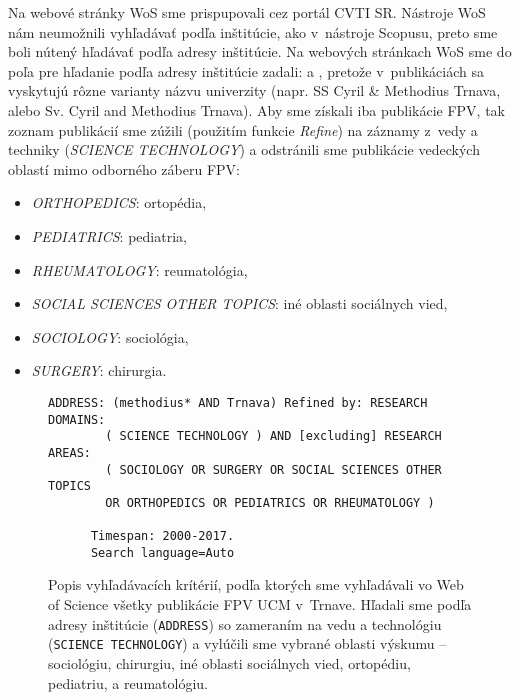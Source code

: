  Na webové stránky WoS sme prispupovali cez portál CVTI SR. Nástroje WoS nám
  neumožnili vyhľadávať podľa inštitúcie, ako v~nástroje Scopusu, preto sme boli
  nútený hľadávať podľa adresy inštitúcie. Na webových stránkach WoS sme do poľa
  pre hľadanie podľa adresy inštitúcie zadali:  a ,
  pretože v~publikáciách sa vyskytujú rôzne varianty názvu univerzity (napr. SS
  Cyril \& Methodius Trnava, alebo Sv. Cyril and Methodius Trnava).  Aby sme
  získali iba publikácie FPV, tak zoznam publikácií sme zúžili (použitím funkcie
  \emph{Refine}) na záznamy z~vedy a techniky (\emph{SCIENCE TECHNOLOGY}) a
  odstránili sme publikácie vedeckých oblastí mimo odborného záberu FPV:

  \begin{itemize}
    \item \emph{ORTHOPEDICS}: ortopédia,
    \item \emph{PEDIATRICS}: pediatria,
    \item \emph{RHEUMATOLOGY}: reumatológia,
    \item \emph{SOCIAL SCIENCES OTHER TOPICS}: iné oblasti sociálnych vied,
    \item \emph{SOCIOLOGY}: sociológia,
    \item \emph{SURGERY}: chirurgia.
  \end{itemize}

  \begin{figure}
    \footnotesize
    \begin{Verbatim}[frame=single]
      ADDRESS: (methodius* AND Trnava) Refined by: RESEARCH DOMAINS:
        ( SCIENCE TECHNOLOGY ) AND [excluding] RESEARCH AREAS:
        ( SOCIOLOGY OR SURGERY OR SOCIAL SCIENCES OTHER TOPICS
        OR ORTHOPEDICS OR PEDIATRICS OR RHEUMATOLOGY )

      Timespan: 2000-2017.
      Search language=Auto
    \end{Verbatim}
    \vspace*{-4mm}
    \caption[Popis kritérií vyhľadávania vo WoS pre FPV]{Popis vyhľadávacích
    krítérií, podľa ktorých sme vyhľadávali vo Web of Science všetky publikácie
    FPV UCM v~Trnave.  Hľadali sme podľa adresy inštitúcie (\texttt{ADDRESS}) so zameraním
    na vedu a technológiu (\texttt{SCIENCE TECHNOLOGY}) a vylúčili sme vybrané
    oblasti výskumu -- sociológiu, chirurgiu, iné oblasti sociálnych vied,
    ortopédiu, pediatriu, a reumatológiu.}
    \label{fig:wos.query}
  \end{figure}


